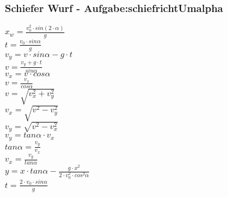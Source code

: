 \subsubsection{Schiefer Wurf  - Aufgabe:schiefrichtUmalpha} 
\begin{minipage}{0.45\textwidth} 
$ x_{w}  = \frac{v_{0} ^{2} \cdot sin(2\cdot \alpha )}{       g} $\\ 
$ t =\frac{v_{0} \cdot sin \alpha }{  g} $\\ 
$ v_{y}  =  v\cdot sin\alpha - g\cdot t $\\ 
$ v= \frac{ v_{y} +g\cdot t}{ sin\alpha } $\\ 
$ v_{x}  = v\cdot  cos\alpha $\\ 
$ v= \frac{ v_{x} }{ cos\alpha } $\\ 
$ v= \sqrt{ v_{x} ^{2} + v_{y} ^{2} } $\\ 
$ v_{x} = \sqrt{ v^{2}  - v_{y} ^{2} } $\\ 
$ v_{y} = \sqrt{ v^{2}  - v_{x} ^{2} } $\\ 
$ v_{y} = tan \alpha \cdot  v_{x} $\\ 
$ tan \alpha = \frac{v_{y} }{v_{x} } $\\ 
$ v_{x} = \frac{v_{y} }{tan \alpha } $\\ 
$ y = x\cdot tan \alpha  - \frac{   g\cdot x^{2} }{2\cdot v^{2} _{0} \cdot cos ^{2}\alpha } $\\ 
$ t =\frac{2\cdot v_{0} \cdot sin \alpha }{ g} $\\ 
\end{minipage} 
\begin{minipage}{0.45\textwidth} 
 
\end{minipage} 
